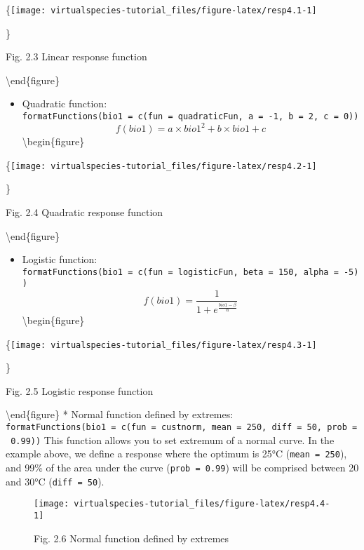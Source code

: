 \documentclass[]{article}
\providecommand{\tightlist}{%
  \setlength{\itemsep}{0pt}\setlength{\parskip}{0pt}}
\begin{document}
\{\centering \texttt{[image: virtualspecies-tutorial\_files/figure-latex/resp4.1-1]}

\}

\caption{Fig. 2.3 Linear response function}\label{fig:resp4.1}

\textbackslash{}end\{figure\}

\begin{itemize}
\tightlist
\item
  Quadratic function:
  \texttt{formatFunctions(bio1\ =\ c(fun\ =\ \textquotesingle{}quadraticFun\textquotesingle{},\ a\ =\ -1,\ b\ =\ 2,\ c\ =\ 0))}
  \[ f(bio1) = a \times bio1^2 + b \times bio1 + c\]
  \textbackslash{}begin\{figure\}
\end{itemize}

\{\centering \texttt{[image: virtualspecies-tutorial\_files/figure-latex/resp4.2-1]}

\}

\caption{Fig. 2.4 Quadratic response function}\label{fig:resp4.2}

\textbackslash{}end\{figure\}

\begin{itemize}
\tightlist
\item
  Logistic function:
  \texttt{formatFunctions(bio1\ =\ c(fun\ =\ \textquotesingle{}logisticFun\textquotesingle{},\ beta\ =\ 150,\ alpha\ =\ -5))}
  \[ f(bio1) = \frac{1}{1 + e^{\frac{bio1 - \beta}{\alpha}}} \]
  \textbackslash{}begin\{figure\}
\end{itemize}

\{\centering \texttt{[image: virtualspecies-tutorial\_files/figure-latex/resp4.3-1]}

\}

\caption{Fig. 2.5 Logistic response function}\label{fig:resp4.3}

\textbackslash{}end\{figure\} * Normal function defined by extremes:
\texttt{formatFunctions(bio1\ =\ c(fun\ =\ \textquotesingle{}custnorm\textquotesingle{},\ mean\ =\ 250,\ diff\ =\ 50,\ prob\ =\ 0.99))}
This function allows you to set extremum of a normal curve. In the
example above, we define a response where the optimum is 25°C
(\texttt{mean\ =\ 250}), and 99\% of the area under the curve
(\texttt{prob\ =\ 0.99}) will be comprised between 20 and 30°C
(\texttt{diff\ =\ 50}).

\begin{figure}

{\centering \texttt{[image: virtualspecies-tutorial\_files/figure-latex/resp4.4-1]} 

}

\caption{Fig. 2.6 Normal function defined by extremes}\label{fig:resp4.4}
\end{figure}
\end{document}
